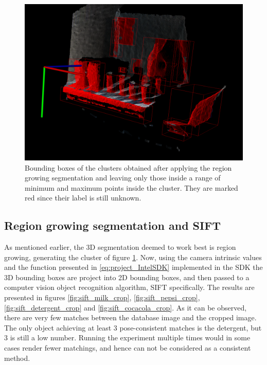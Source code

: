 \documentclass[../main.tex]{subfiles}
\begin{document}
\begin{figure}[H]
    \centering
    \includegraphics[width=0.9\linewidth]{images/annotated_3Dbboxes_allUnknown.png}
    \caption{Bounding boxes of the clusters obtained after applying the region growing segmentation and leaving only those inside a range of minimum and maximum points inside the cluster. They are marked red since their label is still unknown.}
    \label{fig:annotated_3Dbboxes_allUnknown}
\end{figure}

\subsection{Region growing segmentation and SIFT}
As mentioned earlier, the 3D segmentation deemed to work best is region growing, generating the cluster of figure \ref{fig:annotated_3Dbboxes_allUnknown}. Now, using the camera intrinsic values and the function presented in \ref{eq:project_IntelSDK} implemented in the SDK the 3D bounding boxes are project into 2D bounding boxes, and then passed to a computer vision object recognition algorithm, SIFT specifically. The results are presented in figures \ref{fig:sift_milk_crop}, \ref{fig:sift_pepsi_crop}, \ref{fig:sift_detergent_crop} and \ref{fig:sift_cocacola_crop}. As it can be observed, there are very few matches between the database image and the cropped image. The only object achieving at least 3 pose-consistent matches is the detergent, but 3 is still a low number. Running the experiment multiple times would in some cases render fewer matchings, and hence can not be considered as a consistent method.
\end{document}
